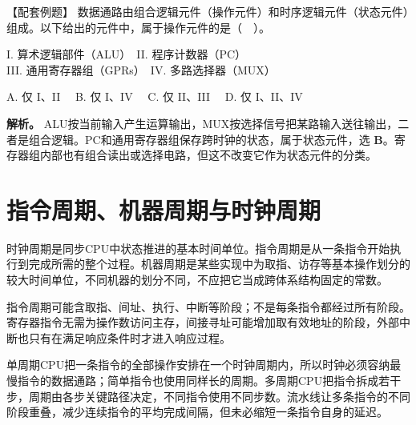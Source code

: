 \begin{example}[配套辨析]

【配套例题】 数据通路由组合逻辑元件（操作元件）和时序逻辑元件（状态元件）组成。以下给出的元件中，属于操作元件的是（　）。

I. 算术逻辑部件（ALU）　II. 程序计数器（PC）\\
III. 通用寄存器组（GPRs）　IV. 多路选择器（MUX）

A. 仅 I、II　 B. 仅 I、IV　 C. 仅 II、III　 D. 仅 I、II、IV

\end{example}

\textbf{解析。} ALU按当前输入产生运算输出，MUX按选择信号把某路输入送往输出，二者是组合逻辑。PC和通用寄存器组保存跨时钟的状态，属于状态元件，选 \textbf{B}。寄存器组内部也有组合读出或选择电路，但这不改变它作为状态元件的分类。

\section{指令周期、机器周期与时钟周期}\label{CO05-cycle}

时钟周期是同步CPU中状态推进的基本时间单位。指令周期是从一条指令开始执行到完成所需的整个过程。机器周期是某些实现中为取指、访存等基本操作划分的较大时间单位，不同机器的划分不同，不应把它当成跨体系结构固定的常数。

指令周期可能含取指、间址、执行、中断等阶段；不是每条指令都经过所有阶段。寄存器指令无需为操作数访问主存，间接寻址可能增加取有效地址的阶段，外部中断也只有在满足响应条件时才进入响应过程。

单周期CPU把一条指令的全部操作安排在一个时钟周期内，所以时钟必须容纳最慢指令的数据通路；简单指令也使用同样长的周期。多周期CPU把指令拆成若干步，周期由各步关键路径决定，不同指令使用不同步数。流水线让多条指令的不同阶段重叠，减少连续指令的平均完成间隔，但未必缩短一条指令自身的延迟。

